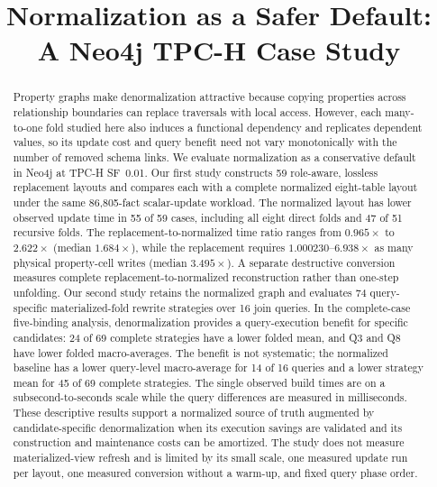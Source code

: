 \documentclass[sigconf]{acmart}
\begin{document}
\title{Normalization as a Safer Default:
A Neo4j TPC-H Case Study}


\begin{abstract}
Property graphs make denormalization attractive because copying properties
across relationship boundaries can replace traversals with local access.
However, each many-to-one fold studied here also induces a functional
dependency and replicates dependent values, so its update cost and query
benefit need not vary monotonically with the number of removed schema links.
We evaluate normalization as a conservative default in Neo4j at TPC-H
SF~0.01. Our first study constructs 59 role-aware, lossless replacement
layouts and compares each with a complete normalized eight-table layout under
the same 86,805-fact scalar-update workload. The normalized layout has lower
observed update time in 55 of 59 cases, including all eight direct folds and
47 of 51 recursive folds. The replacement-to-normalized time ratio ranges from
$0.965\times$ to $2.622\times$ (median $1.684\times$), while the replacement
requires $1.000230$--$6.938\times$ as many physical property-cell writes (median
$3.495\times$). A separate destructive conversion measures complete
replacement-to-normalized reconstruction rather than one-step unfolding.
Our second study retains the normalized graph and evaluates 74 query-specific
materialized-fold rewrite strategies over 16 join queries. In the complete-case
five-binding analysis, denormalization provides a query-execution benefit for
specific candidates: 24 of 69 complete strategies have a lower folded mean,
and Q3 and Q8 have lower folded macro-averages. The benefit is not systematic;
the normalized baseline has a lower query-level macro-average for 14 of 16
queries and a lower strategy mean for 45 of 69 complete strategies. The single
observed build times are on a subsecond-to-seconds scale while the query
differences are measured in milliseconds. These descriptive results support a
normalized source of truth augmented by candidate-specific denormalization
when its execution savings are validated and its construction and maintenance
costs can be amortized. The study does not measure materialized-view refresh
and is limited by its small scale, one measured update run per layout, one
measured conversion without a warm-up, and fixed query phase order.
\end{abstract}
\end{document}
